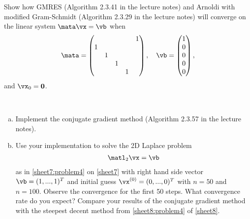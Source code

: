 \begin{Sheet}
  \begin{Problem}
    Show how GMRES (Algorithm 2.3.41 in the lecture notes) and Arnoldi
    with modified Gram-Schmidt (Algorithm 2.3.29 in the lecture notes)
    will converge on the linear system $\mata\vx=\vb$ when
    \begin{gather*}
      \mata =
      \begin{pmatrix}
        &&&&1\\
        1&&&&\\
        &1&&&\\
        &&1&&\\
        &&&1&
      \end{pmatrix},
      \quad
      \vb =
      \begin{pmatrix}
        1\\ 0\\ 0\\ 0\\ 0
      \end{pmatrix},
    \end{gather*}
    and $\vx_0 = \boldsymbol 0$.
  \end{Problem}

  \begin{Problem}[Programming]
    \hfill\\\vspace{-4ex}
    \begin{enumerate}[(a)]
    \item Implement the conjugate gradient method (Algorithm 2.3.57 in
      the lecture notes).
    \item Use your implementation to solve the 2D Laplace problem
      \begin{gather*}
        \matl_2\vx=\vb
      \end{gather*}
      as in \cref{sheet7:problem4} on \cref{sheet7} with right hand
      side vector $\vb=(1,...,1)^T$ and initial guess
      $\vx^{(0)}=(0,...,0)^T$ with $n=50$ and $n=100$. Observe the
      convergence for the first 50 steps. What convergence rate do you
      expect? Compare your results of the conjugate gradient method
      with the steepest decent method from \cref{sheet8:problem4} of
      \cref{sheet8}.
    \end{enumerate}
  \end{Problem}

\end{Sheet}


